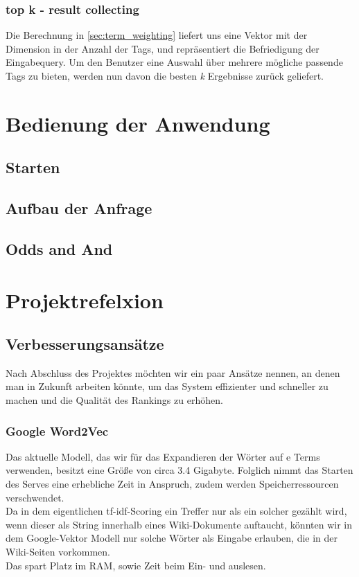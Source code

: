 \documentclass[12pt,pdftex,a4paper]{article}
\begin{document}
\subsubsection{top k - result collecting}
Die Berechnung in \autoref{sec:term_weighting} liefert uns eine Vektor mit der Dimension in der Anzahl der Tags, und repräsentiert die Befriedigung der Eingabequery. Um den Benutzer eine Auswahl über mehrere mögliche passende Tags zu bieten, werden nun davon die besten \textit{k} Ergebnisse zurück geliefert.


\section{Bedienung der Anwendung}

\subsection{Starten}
\subsection{Aufbau der Anfrage}
\subsection{Odds and And}

\section{Projektrefelxion}
\subsection{Verbesserungsansätze}
Nach Abschluss des Projektes möchten wir ein paar Ansätze nennen, an denen man in Zukunft arbeiten könnte, um das System effizienter und schneller zu machen und die Qualität des Rankings zu erhöhen.
\subsubsection{Google Word2Vec}
Das aktuelle Modell, das wir für das Expandieren der Wörter auf e Terms verwenden, besitzt eine Größe von circa 3.4 Gigabyte. Folglich nimmt das Starten des Serves eine erhebliche Zeit in Anspruch, zudem werden Speicherressourcen verschwendet.\\
Da in dem eigentlichen tf-idf-Scoring ein Treffer nur als ein solcher gezählt wird, wenn dieser als String innerhalb eines Wiki-Dokumente auftaucht, könnten wir in dem Google-Vektor Modell nur solche Wörter als Eingabe erlauben, die in der Wiki-Seiten vorkommen.\\
Das spart Platz im RAM, sowie Zeit beim Ein- und auslesen.
\end{document}
